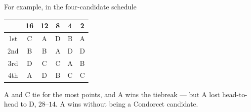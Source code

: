 \documentclass[12pt]{ximera}
\begin{document}
\begin{problem}
\begin{prompt}
\begin{feedback}
For example, in the four-candidate schedule
\begin{center}
\begin{tabular}{c|ccccc}
 & 16 & 12 & 8 & 4 & 2\\\hline
1st & C & A & D & B & A\\
2nd & B & B & A & D & D\\
3rd & D & C & C & A & B\\
4th & A & D & B & C & C
\end{tabular}
\end{center}
A and C tie for the most points, and A wins the tiebreak --- but A lost head-to-head to D,
$28$--$14$. A wins without being a Condorcet candidate.
\end{feedback}
\end{prompt}
\end{problem}
\end{document}
